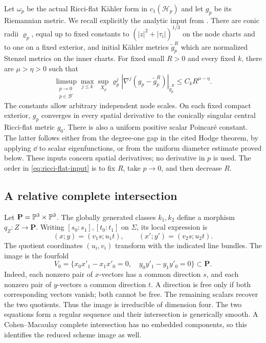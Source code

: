 Let $\omega_p$ be the actual Ricci-flat Kähler form in
$c_1(\mathcal H_p)$ and let $g_p$ be its Riemannian metric.
We recall explicitly the analytic input from
\cite[Theorem 9.1 and Section 10]{W_Hodge}. There are conic radii
$\varrho_p$, equal up to fixed constants to
$(|z|^2+|\tau_i|)^{1/3}$ on the node charts and to one on a fixed
exterior, and initial Kähler metrics $\widetilde g_p^R$ which are
normalized Stenzel metrics on the inner charts. For fixed small
$R>0$ and every fixed $k$, there are $\mu>\eta>0$ such that
\begin{equation}\label{eq:ricci-flat-input}
 \limsup_{\substack{p\to0\\p\in\mathcal B^\circ}}
 \max_{j\le k}\sup_{X_p}\varrho_p^j
 |\nabla^j(g_p-\widetilde g_p^R)|_{\widetilde g_p^R}
       \le C_k R^{\mu-\eta}.
\end{equation}
The constants allow arbitrary independent node scales. On each
fixed compact exterior, $g_p$ converges in every spatial derivative
to the conically singular central Ricci-flat metric $g_0$.
There is also a uniform positive scalar Poincaré constant.
The latter follows either from the degree-one gap in the cited
Hodge theorem, by applying $\dd$ to scalar eigenfunctions, or
from the uniform diameter estimate proved below. These inputs
concern spatial derivatives; no derivative in $p$ is used.
The order in \eqref{eq:ricci-flat-input} is to fix $R$, take
$p\to0$, and then decrease $R$.

\subsection{A relative complete intersection}

Let $\mathbf P=\mathbb P^3\times\mathbb P^3$. The globally generated classes
$k_1,k_2$ define a morphism $q_Z:Z\to\mathbf P$.
Writing $[s_0:s_1],[t_0:t_1]$ on $\Sigma$, its local expression is
\[
 (x;y)=(v_1s;u_1t),\qquad
 (x';y')=(v_2s;u_2t).
\]
The quotient coordinates $(u_i,v_i)$ transform with the indicated
line bundles. The image is the fourfold
\begin{equation}\label{eq:ambient-central}
 V_0=\{x_0x'_1-x_1x'_0=0,\quad
                         y_0y'_1-y_1y'_0=0\}\subset\mathbf P.
\end{equation}
Indeed, each nonzero pair of $x$-vectors has a common direction
$s$, and each nonzero pair of $y$-vectors a common direction $t$.
A direction is free only if both corresponding vectors vanish;
both cannot be free. The remaining scalars recover the two
quotients. Thus the image is irreducible of dimension four.
The two equations form a regular sequence and their intersection
is generically smooth. A Cohen--Macaulay complete intersection
has no embedded components, so this identifies the reduced scheme
image as well.

